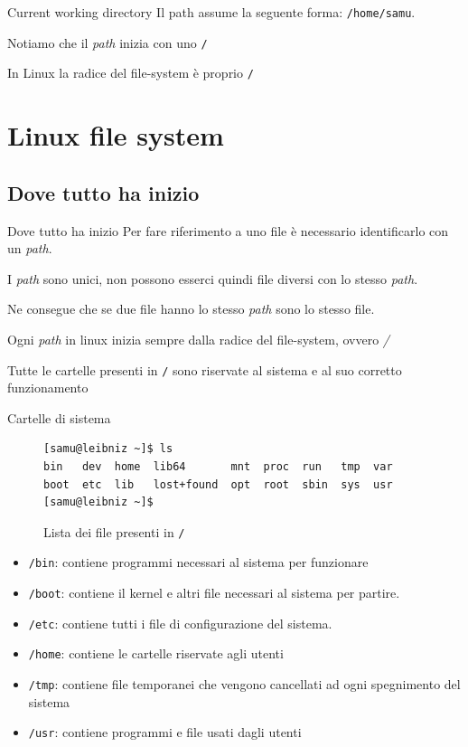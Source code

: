 \documentclass{beamer}
\begin{document}
\begin{frame}{Current working directory}
  Il path assume la seguente forma: \texttt{/home/samu}.\bigskip

  Notiamo che il \textit{path} inizia con uno \texttt{/}\bigskip

  In Linux la radice del file-system è proprio \texttt{/}
\end{frame}

\section{Linux file system}

\subsection{Dove tutto ha inizio}
\begin{frame}{Dove tutto ha inizio}
  Per fare riferimento a uno file è necessario identificarlo con un 
  \textit{path}. \bigskip

  I \textit{path} sono unici, non possono esserci quindi file diversi con lo 
  stesso \textit{path}. \bigskip

  Ne consegue che se due file hanno lo stesso \textit{path} sono lo stesso file.
  \bigskip

  Ogni \textit{path} in linux inizia sempre dalla radice del file-system, ovvero
  \textit{/}\bigskip

  Tutte le cartelle presenti in \texttt{/} sono riservate al sistema e al suo
  corretto funzionamento
\end{frame}

\begin{frame}[fragile]{Cartelle di sistema}
  \begin{figure}
    \begin{lstlisting}[basicstyle=\footnotesize]
[samu@leibniz ~]$ ls
bin   dev  home  lib64       mnt  proc  run   tmp  var
boot  etc  lib   lost+found  opt  root  sbin  sys  usr
[samu@leibniz ~]$
    \end{lstlisting}
    \caption{Lista dei file presenti in \texttt{/}}
  \end{figure}
  \begin{itemize}
    \item \texttt{/bin}: contiene programmi necessari al sistema per funzionare
    \item \texttt{/boot}: contiene il kernel e altri file necessari al sistema
      per partire.
    \item \texttt{/etc}: contiene tutti i file di configurazione del sistema.
    \item \texttt{/home}: contiene le cartelle riservate agli utenti
    \item \texttt{/tmp}: contiene file temporanei che vengono cancellati ad ogni
      spegnimento del sistema
    \item \texttt{/usr}: contiene programmi e file usati dagli utenti
  \end{itemize}
\end{frame}
\end{document}
